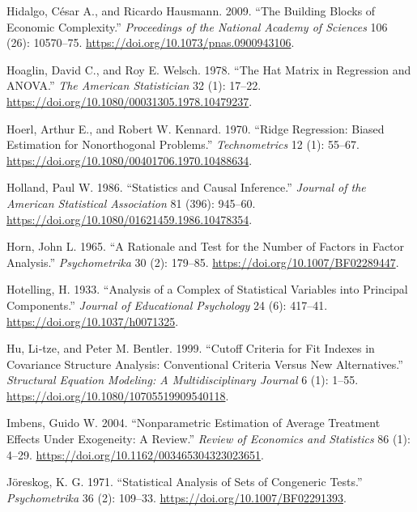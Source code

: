 \documentclass[
  letterpaper,
  10pt,
  twoside,
  openright,
  numbers=noenddot,
  chapterprefix=true]{scrbook}
\newlength{\cslhangindent}
\newenvironment{CSLReferences}[2] %
 {\begin{list}{}{%
  \setlength{\itemindent}{0pt}
  \setlength{\leftmargin}{0pt}
  \setlength{\parsep}{0pt}
  \ifodd #1
   \setlength{\leftmargin}{\cslhangindent}
   \setlength{\itemindent}{-1\cslhangindent}
  \fi
  \setlength{\itemsep}{#2\baselineskip}}}
 {\end{list}}
\begin{document}
\begin{CSLReferences}{1}{0}
Hidalgo, César A., and Ricardo Hausmann. 2009. {``{The} Building Blocks
of Economic Complexity.''} \emph{{Proceedings} of the {National}
{Academy} of {Sciences}} 106 (26): 10570--75.
\url{https://doi.org/10.1073/pnas.0900943106}.

Hoaglin, David C., and Roy E. Welsch. 1978. {``{The} {Hat} {Matrix} in
{Regression} and {ANOVA}.''} \emph{{The} {American} {Statistician}} 32
(1): 17--22. \url{https://doi.org/10.1080/00031305.1978.10479237}.

Hoerl, Arthur E., and Robert W. Kennard. 1970. {``{Ridge} {Regression}:
{Biased} {Estimation} for {Nonorthogonal} {Problems}.''}
\emph{{Technometrics}} 12 (1): 55--67.
\url{https://doi.org/10.1080/00401706.1970.10488634}.

Holland, Paul W. 1986. {``{Statistics} and {Causal} {Inference}.''}
\emph{{Journal} of the {American} {Statistical} {Association}} 81 (396):
945--60. \url{https://doi.org/10.1080/01621459.1986.10478354}.

Horn, John L. 1965. {``A {Rationale} and {Test} for the {Number} of
{Factors} in {Factor} {Analysis}.''} \emph{{Psychometrika}} 30 (2):
179--85. \url{https://doi.org/10.1007/BF02289447}.

Hotelling, H. 1933. {``{Analysis} of a Complex of Statistical Variables
into Principal Components.''} \emph{{Journal} of {Educational}
{Psychology}} 24 (6): 417--41. \url{https://doi.org/10.1037/h0071325}.

Hu, Li‐tze, and Peter M. Bentler. 1999. {``{Cutoff} Criteria for Fit
Indexes in Covariance Structure Analysis: {Conventional} Criteria Versus
New Alternatives.''} \emph{{Structural} {Equation} {Modeling}: A
{Multidisciplinary} {Journal}} 6 (1): 1--55.
\url{https://doi.org/10.1080/10705519909540118}.

Imbens, Guido W. 2004. {``{Nonparametric} {Estimation} of {Average}
{Treatment} {Effects} {Under} {Exogeneity}: A {Review}.''}
\emph{{Review} of {Economics} and {Statistics}} 86 (1): 4--29.
\url{https://doi.org/10.1162/003465304323023651}.

Jöreskog, K. G. 1971. {``{Statistical} {Analysis} of {Sets} of
{Congeneric} {Tests}.''} \emph{{Psychometrika}} 36 (2): 109--33.
\url{https://doi.org/10.1007/BF02291393}.


\end{CSLReferences}
\end{document}
